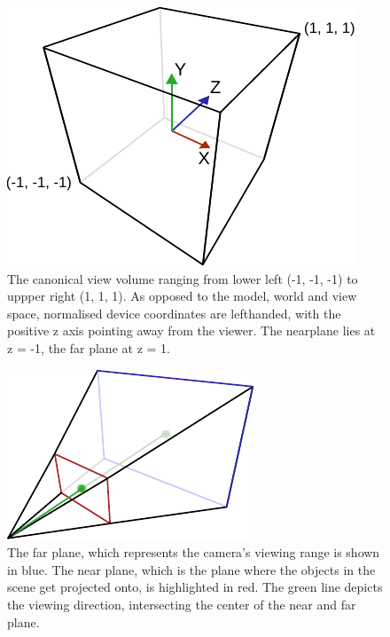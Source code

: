 \begin{figure}
\begin{center}
\includegraphics[scale=0.8]{Images/CanonicalCube.pdf}
\caption[The canonical view volume]{The canonical view volume ranging from lower
left (-1, -1, -1) to uppper right (1, 1, 1). As opposed to the model, world and
view space, normalised device coordinates are lefthanded, with the positive z
axis pointing away from the viewer. The nearplane lies at z = -1, the far plane
at z = 1.}
\label{fig:canonicalviewvolume}
\end{center}
\end{figure}

\begin{figure}
\begin{center}
 \includegraphics[scale=1.0]{Images/Frustum.pdf}
 \caption[The view frustum]{The far plane, which represents the camera's viewing
range is shown in blue. The near plane, which is the plane where the objects in
the scene get projected onto, is highlighted in red. The green line depicts the
viewing direction, intersecting the center of the near and far plane.}
 \label{fig:viewfrustum3d}
\end{center} 
\end{figure}

